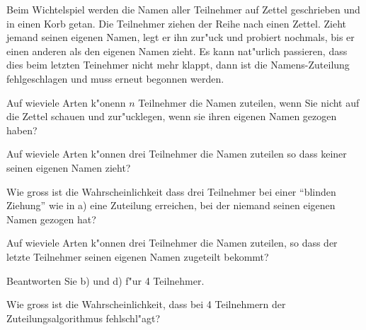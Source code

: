 Beim Wichtelspiel werden die Namen aller Teilnehmer auf Zettel geschrieben
und in einen Korb getan.
Die Teilnehmer ziehen der Reihe nach einen Zettel.
Zieht jemand seinen eigenen Namen, legt er ihn zur"uck und probiert
nochmals, bis er einen anderen als den eigenen Namen zieht.
Es kann nat"urlich passieren, dass dies beim letzten Teinehmer
nicht mehr klappt, dann ist die Namens-Zuteilung fehlgeschlagen und
muss erneut begonnen werden.

\begin{teilaufgaben}
\item Auf wieviele Arten k"onenn $n$ Teilnehmer die Namen zuteilen,
wenn Sie nicht auf die Zettel schauen und zur"ucklegen, wenn sie ihren
eigenen Namen gezogen haben?
\item Auf wieviele Arten k"onnen drei Teilnehmer die Namen zuteilen
so dass keiner seinen eigenen Namen zieht?
\item Wie gross ist die Wahrscheinlichkeit dass drei Teilnehmer
bei einer ``blinden Ziehung'' wie in a) eine Zuteilung erreichen, bei
der niemand seinen eigenen Namen gezogen hat?
\item Auf wieviele Arten k"onnen drei Teilnehmer die Namen zuteilen,
so dass der letzte Teilnehmer seinen eigenen Namen zugeteilt bekommt?
\item Beantworten Sie b) und d) f"ur 4 Teilnehmer.
\item Wie gross ist die Wahrscheinlichkeit, dass bei 4 Teilnehmern
der Zuteilungsalgorithmus fehlschl"agt?
\end{teilaufgaben}

